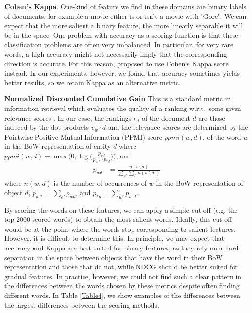 \noindent \textbf{Cohen's Kappa}. One-kind of feature we find in these domains are binary labels of documents, for example a movie either is or isn't a movie with "Gore". We can expect that the more salient a binary feature, the more linearly separable it will be in the space. One problem with accuracy as a scoring function is that these classification problems are often very imbalanced. In particular, for very rare words, a high accuracy might not necessarily imply that the corresponding direction is accurate. For this reason, \cite{Derrac2015} proposed to use Cohen's Kappa score instead. In our experiments, however, we found that accuracy sometimes yields better results, so we retain Kappa as an alternative metric. %
\smallskip

\noindent \textbf{Normalized Discounted Cumulative Gain} %
This is a standard metric in information retrieval which evaluates the quality of a ranking w.r.t.\ some given relevance scores \cite{jarvelin2002cumulated}.  In our case, the rankings $r_d$ of the document $d$ are those induced by the dot products $v_w \cdot d$ and the relevance scores are determined by the Pointwise Positive Mutual Information (PPMI) score $\textit{ppmi}(w,d)$, of the word $w$ in the BoW representation of entity $d$ where
$\textit{ppmi}(w,d) = \max \big(0, \log\big(\frac{p_{wd}}{p_{w*} \cdotp p_{*d}}\big)\big)$, and
\begin{align*}
p_{wd} &= \frac{n(w, d)}{\sum_{w'} \sum_{d'} n(w', d')}
\end{align*}
where $n(w,d)$ is the number of occurrences of $w$ in the BoW representation of object $d$, $p_{w*} = \sum_{e'} p_{wd'}$ and $p_{*d} = \sum_{w'} p_{w'd}$. %
\smallskip

By scoring the words on these features, we can apply a simple cut-off (e.g. the top 2000 scored words) to obtain the most salient words. Ideally, this cut-off would be at the point where the words stop corresponding to salient features. However, it is difficult to determine this. In principle, we may expect that accuracy and Kappa are best suited for binary features, as they rely on a hard separation in the space between objects that have the word in their BoW representation and those that do not, while NDCG should be better suited for gradual features. In practice, however, we could not find such a clear pattern in the differences between the words chosen by these metrics despite often finding different words. In Table \ref{Table4}, we show examples of the differences between the largest differences between the scoring methods. %



